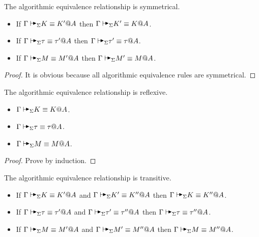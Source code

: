 \begin{lemma}
    The algorithmic equivalence relationship is symmetrical.
    \label{lemma:SymmetricityinAlgorithmicEquivalence}
    \begin{itemize}
        \item If \( \G \AVS K \E K' @ A \) then \( \G \AVS K' \E K @ A \).
        \item If \( \G \AVS \tau \E \tau' @ A \) then \( \G \AVS \tau' \E \tau @ A \).
        \item If \( \G \AVS M \E M' @ A \) then \( \G \AVS M' \E M @ A \).
    \end{itemize}
\end{lemma}

\begin{proof}
    It is obvious because all algorithmic equivalence rules are symmetrical.
\end{proof}

\begin{lemma}
    The algorithmic equivalence relationship is reflexive.
    \label{lemma:ReflexivityinAlgorithmicEquivalence}
    \begin{itemize}
        \item \( \G \AVS K \E K @ A \).
        \item \( \G \AVS \tau \E \tau @ A \).
        \item \( \G \AVS M \E M @ A \).
    \end{itemize}
\end{lemma}

\begin{proof}
    Prove by induction.
\end{proof}

\begin{lemma}
    The algorithmic equivalence relationship is transitive.
    \label{lemma:TransitioninAlgorithmicEquivalence}
    \begin{itemize}
        \item If \( \G \AVS K \E K' @ A \) and \( \G \AVS K' \E K'' @ A \) then \( \G \AVS K \E K'' @ A \).
        \item If \( \G \AVS \tau \E \tau' @ A \) and \( \G \AVS \tau' \E \tau'' @ A \) then \( \G \AVS \tau \E \tau'' @ A \).
        \item If \( \G \AVS M \E M' @ A \) and \( \G \AVS M' \E M'' @ A \) then \( \G \AVS M \E M'' @ A \).
    \end{itemize}
\end{lemma}

